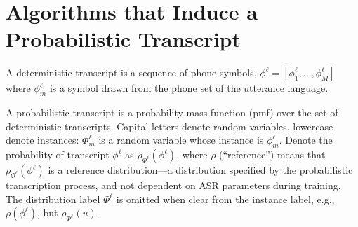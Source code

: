 \section{Algorithms that Induce a Probabilistic Transcript}

A deterministic transcript is a sequence of phone symbols,
$\phi^\ell =[\phi_1^\ell,\ldots,\phi_M^\ell]$ where $\phi_m^\ell$ is a
symbol drawn from the phone set of the utterance language.

A probabilistic transcript is a probability mass function (pmf)
over the set of deterministic transcripts.  Capital letters denote
random variables, lowercase denote instances: $\Phi^{\ell}_m$ is a
random variable whose instance is $\phi_m^\ell$.
Denote the probability of transcript $\phi^{\ell}$
as $\rho_{\Phi^\ell}(\phi^{\ell})$, where $\rho$ (``reference'') means
that $\rho_{\Phi^\ell}(\phi^{\ell})$ is a reference distribution---a
distribution specified by the probabilistic transcription process, and
not dependent on ASR parameters during training.  The
distribution label $\Phi^\ell$ is omitted when clear from the instance
label, e.g., $\rho(\phi^\ell)$, but $\rho_{\Phi^\ell}(u)$.
